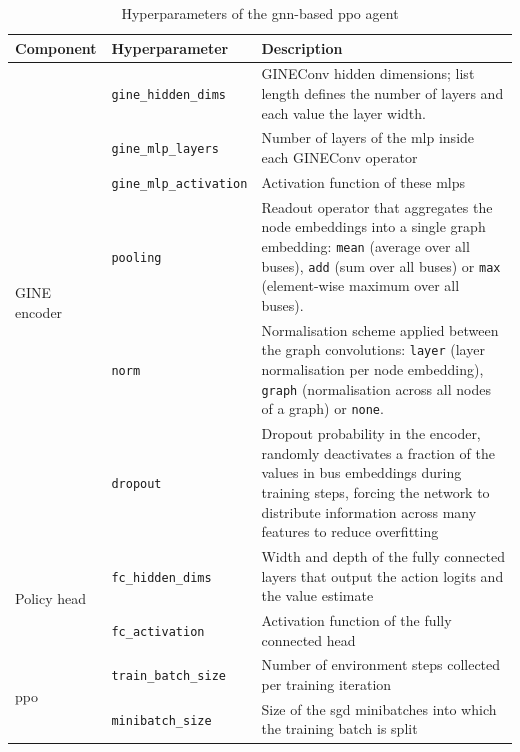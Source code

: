 \newcommand{\hprule}{\cmidrule(l){2-3}}
\begin{table}[htbp]
  \centering
  \footnotesize 
  \caption{Hyperparameters of the \ac{gnn}-based \ac{ppo} agent}
  \label{tab:ppo-hparams}
  \begin{tabularx}{\textwidth}{@{}llX@{}}
    \toprule
    \textbf{Component} & \textbf{Hyperparameter} & \textbf{Description} \\
    \midrule
    \multirow{6}{*}{GINE encoder}
        & \texttt{gine\_hidden\_dims}     & GINEConv hidden dimensions; list length defines the number of layers and each value the layer width. \\
        \hprule
        & \texttt{gine\_mlp\_layers}      & Number of layers of the \ac{mlp} inside each GINEConv operator \\
        \hprule
        & \texttt{gine\_mlp\_activation}  & Activation function of these \acp{mlp} \\
        \hprule
        & \texttt{pooling}                & Readout operator that aggregates the node embeddings into a single graph embedding: \texttt{mean} (average over all buses), \texttt{add} (sum over all buses) or \texttt{max} (element-wise maximum over all buses). \\
        \hprule
        & \texttt{norm}                   & Normalisation scheme applied between the graph convolutions: \texttt{layer} (layer normalisation per node embedding), \texttt{graph} (normalisation across all nodes of a graph) or \texttt{none}. \\
        \hprule
        & \texttt{dropout}                & Dropout probability in the encoder, randomly deactivates a fraction of the values in bus embeddings during training steps, forcing the network to distribute information across many features to reduce overfitting \\
    \midrule
    \multirow{2}{*}{Policy head}
        & \texttt{fc\_hidden\_dims}       & Width and depth of the fully connected layers that output the action logits and the value estimate \\
        \hprule
        & \texttt{fc\_activation}         & Activation function of the fully connected head \\
    \midrule
    \multirow{9}{*}{\ac{ppo}}
        & \texttt{train\_batch\_size}     & Number of environment steps collected per training iteration \\
        \hprule
        & \texttt{minibatch\_size}        & Size of the \ac{sgd} minibatches into which the training batch is split \\

\end{tabularx}
\end{table}
